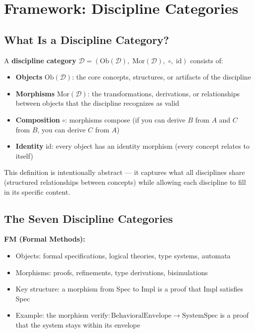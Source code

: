 \documentclass[11pt,a4paper]{article}
\begin{document}
\section{Framework: Discipline Categories}

\subsection{What Is a Discipline Category?}

A \textbf{discipline category} $\mathcal{D} = (\mathrm{Ob}(\mathcal{D}),\; \mathrm{Mor}(\mathcal{D}),\; \circ,\; \mathrm{id})$ consists of:
\begin{itemize}
    \item \textbf{Objects} $\mathrm{Ob}(\mathcal{D})$: the core concepts, structures, or artifacts of the discipline
    \item \textbf{Morphisms} $\mathrm{Mor}(\mathcal{D})$: the transformations, derivations, or relationships between objects that the discipline recognizes as valid
    \item \textbf{Composition} $\circ$: morphisms compose (if you can derive $B$ from $A$ and $C$ from $B$, you can derive $C$ from $A$)
    \item \textbf{Identity} $\mathrm{id}$: every object has an identity morphism (every concept relates to itself)
\end{itemize}

This definition is intentionally abstract --- it captures what all disciplines share (structured relationships between concepts) while allowing each discipline to fill in its specific content.

\subsection{The Seven Discipline Categories}

\textbf{FM (Formal Methods):}
\begin{itemize}
    \item Objects: formal specifications, logical theories, type systems, automata
    \item Morphisms: proofs, refinements, type derivations, bisimulations
    \item Key structure: a morphism from Spec to Impl is a proof that Impl satisfies Spec
    \item Example: the morphism $\mathrm{verify}: \mathrm{BehavioralEnvelope} \to \mathrm{SystemSpec}$ is a proof that the system stays within its envelope
\end{itemize}
\end{document}
